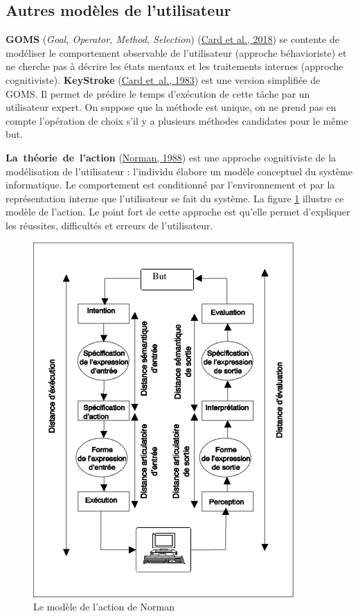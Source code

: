 \documentclass[
]{book}
\begin{document}
\hypertarget{autres-moduxe8les-de-lutilisateur}{%
\subsection{Autres modèles de l'utilisateur}\label{autres-moduxe8les-de-lutilisateur}}

\textbf{GOMS}
(\emph{Goal, Operator, Method, Selection})
(\protect\hyperlink{ref-card2018psychology}{Card et al., 2018}) se contente de
modéliser le comportement observable de l'utilisateur (approche
béhavioriste) et ne cherche pas à décrire les états mentaux et les
traitements internes (approche cognitiviste).
\textbf{KeyStroke}
(\href{047-bibliographie.html\#Card1983}{Card et~al.,
1983}) est une version simplifiée de GOMS. Il permet de prédire le temps
d'exécution de cette tâche par un utilisateur expert. On suppose que la
méthode est unique, on ne prend pas en compte l'opération de choix s'il y a
plusieurs méthodes candidates pour le même but.

\textbf{La~théorie~de~l'action}
(\protect\hyperlink{ref-norman1988psychology}{Norman, 1988}) est une approche cognitiviste de la modélisation de l'utilisateur
: l'individu élabore un modèle conceptuel du système informatique. Le
comportement est conditionné par l'environnement et par la représentation
interne que l'utilisateur se fait du système. La figure \ref{fig:norman} illustre ce modèle de l'action. Le point fort de
cette approche est qu'elle permet d'expliquer les réussites, difficultés et
erreurs de l'utilisateur.

\begin{figure}
\centering
\includegraphics{img/design.png}
\caption{\label{fig:norman}Le modèle de l'action de Norman}
\end{figure}
\end{document}
